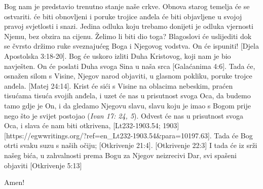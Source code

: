 Bog nam je predstavio trenutno stanje naše crkve. Obnova starog temelja će se ostvariti.  će biti obnovljeni i poruke trojice anđela će biti objavljene u svojoj pravoj svjetlosti i snazi. Jedina odluka koju trebamo donijeti je odluka vjernosti Njemu, bez obzira na cijenu. Želimo li biti dio toga? Blagoslovi će uslijediti dok se čvrsto držimo ruke sveznajućeg Boga i Njegovog vodstva.  On će ispuniti! [Djela Apostolska 3:18-20]. Bog će uskoro izliti Duha Kristovog, koji nam je bio navješten. On će poslati Duha svoga Sina u naša srca [Galaćanima 4:6]. Tada će, osnažen silom s Visine, Njegov narod objaviti, u glasnom pokliku, poruke trojce anđela. [Matej 24:14]. Krist će sići s Visine na oblacima nebeskim, praćen tisućama tisuća svojih anđela, i uzet će nas u prisutnost svoga Oca, da budemo tamo gdje je On, i da gledamo Njegovu slavu, slavu koju je imao s Bogom prije nego što je svijet postojao (\textit{Ivan 17: 24, 5}). Odvest će nas u prisutnost svoga Oca, i slava će nam biti otkrivena, [Lt232-1903.54; 1903][https://egwwritings.org/?ref=en\_Lt232-1903.54&para=10197.63]. Tada će Bog otrti svaku suzu s naših očiju; [Otkrivenje 21:4]. [Otkrivenje 22:3] I tada će iz srži našeg bića, u zahvalnosti prema Bogu za Njegov neizrecivi Dar, svi spašeni  objaviti [Otkrivenje 5:13]

Amen!
